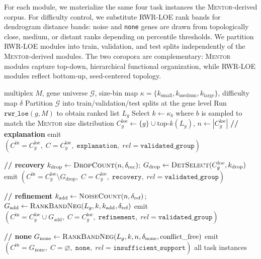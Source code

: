 \documentclass[thesis,letterpaper,12pt]{utthesis}
\begin{document}
For each module, we materialize the same four task instances the \textsc{Mentor}-derived corpus. For difficulty control, we substitute RWR-LOE rank bands for dendrogram distance bands: noise and \texttt{none} genes are drawn from topologically close, medium, or distant ranks depending on percentile thresholds. We partition RWR-LOE modules into train, validation, and test splits independently of the \textsc{Mentor}-derived modules. The two coropora are complementary: \textsc{Mentor} modules capture top-down, hierarchical functional organization, while RWR-LOE modules reflect bottom-up, seed-centered topology.
\begin{algorithm}[t]
\caption{Creation of the RWR-LOE module training corpus}
\label{alg:loe-module-corpus}
\begin{algorithmic}[1]
\Require multiplex $M$, gene universe $\mathcal{G}$,
         size-bin map $\kappa = \{k_{\text{small}}, k_{\text{medium}},
         k_{\text{large}}\}$, difficulty map $\delta$
\State Partition $\mathcal{G}$ into train/validation/test splits at the gene level
    \State Run $\texttt{rwr\_loe}(g, M)$ to obtain ranked list $L_g$
    \State Select $k \gets \kappa_b$ where $b$ is sampled to match the
           \textsc{Mentor} size distribution
    \State $C^{\text{loe}}_g \gets \{g\} \cup \mathrm{top\text{-}}k(L_g)$,
           \quad $n \gets |C^{\text{loe}}_g|$
    \State \textbf{// explanation}
    \State emit $(C^{\text{in}} = C^{\text{loe}}_g,\; C = C^{\text{loe}}_g,\;
           \texttt{explanation},\; rel=\texttt{validated\_group})$

    \State \textbf{// recovery}
    \State $k_{\text{drop}} \gets \textsc{DropCount}(n, \delta_{\text{rec}})$;
           \quad $G_{\text{drop}} \gets \textsc{DetSelect}(C^{\text{loe}}_g,
           k_{\text{drop}})$
    \State emit $(C^{\text{in}} = C^{\text{loe}}_g \setminus G_{\text{drop}},\;
           C = C^{\text{loe}}_g,\; \texttt{recovery},\;
           rel=\texttt{validated\_group})$

    \State \textbf{// refinement}
    \State $k_{\text{add}} \gets \textsc{NoiseCount}(n, \delta_{\text{ref}})$;
           \quad $G_{\text{add}} \gets \textsc{RankBandNeg}(L_g, k, k_{\text{add}},
           \delta_{\text{ref}})$
    \State emit $(C^{\text{in}} = C^{\text{loe}}_g \cup G_{\text{add}},\;
           C = C^{\text{loe}}_g,\; \texttt{refinement},\;
           rel=\texttt{validated\_group})$

    \State \textbf{// none}
    \State $G_{\text{none}} \gets \textsc{RankBandNeg}(L_g, k, n, \delta_{\text{none}},
           \text{conflict\_free})$
    \State emit $(C^{\text{in}} = G_{\text{none}},\; C = \varnothing,\;
           \texttt{none},\; rel=\texttt{insufficient\_support})$
\EndFor
\State \Return all task instances
\end{algorithmic}
\end{algorithm}
\end{document}
